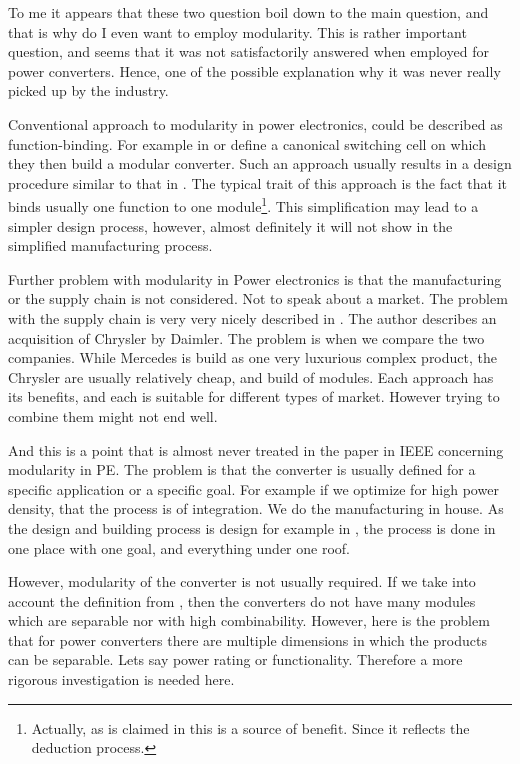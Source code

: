\documentclass[]{scrartcl}
\begin{document}
To me it appears that these two question boil down to the main question, and that is why do I even want to employ modularity. This is rather important question, and seems that it was not satisfactorily answered when employed for power converters. Hence, one of the possible explanation why it was never really picked up by the industry. 

Conventional approach to modularity in power electronics, could be described as function-binding. For example in \cite{Khan2007} or \cite{Kenzelmann2012a} define a canonical switching cell on which they then build a modular converter. Such an approach usually results in a design procedure similar to that in \cite{Ortjohann2009}. The typical trait of this approach is the fact that it binds usually one function to one module\footnote{Actually, as is claimed in \cite{Li2006} this is a source of benefit. Since it reflects the deduction process.}. This simplification may lead to a simpler design process, however, almost definitely it will not show in the simplified manufacturing process. 

Further problem with modularity in Power electronics is that the manufacturing or the supply chain is not considered. Not to speak about a market. The problem with the supply chain is very very nicely described in \cite{Fine2005}. The author describes an acquisition of Chrysler by Daimler. The problem is when we compare the two companies. While Mercedes is build as one very luxurious complex product, the Chrysler are usually relatively cheap, and build of modules. Each approach has its benefits, and each is suitable for different types of market. However trying to combine them might not end well. 

And this is a point that is almost never treated in the paper in IEEE concerning modularity in PE. The problem is that the converter is usually defined for a specific application or a specific goal. For example if we optimize for high power density, that the process is of integration. We do the manufacturing in house. As the design and building process is design for example in \cite{Abraham2005}, the process is done in one place with one goal, and everything under one roof. 

However, modularity of the converter is not usually required. If we take into account the definition from \cite{Salvador2007}, then the converters do not have many modules which are separable nor with high combinability. However, here is the problem that for power converters there are multiple dimensions in which the products can be separable. Lets say power rating or functionality. Therefore a more rigorous investigation is needed here. 
\end{document}
